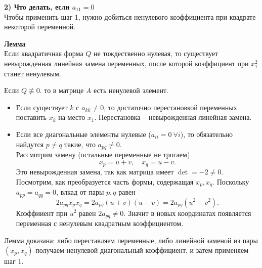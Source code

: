 \documentclass[14pt]{extreport}
\begin{document}
\begin{prbox}
        \textbf{2) Что делать, если $a_{11} = 0$}\\
        Чтобы применить шаг 1, нужно добиться ненулевого коэффициента при квадрате некоторой переменной.
        \begin{thbox}
            \textbf{Лемма}\\
            Если квадратичная форма $Q$ не тождественно нулевая, то существует невырожденная линейная замена переменных, после которой коэффициент при $x_1^2$ станет ненулевым.
        \end{thbox}
        \begin{prbox}
            Если $Q \not\equiv 0$. то в матрице $A$ есть ненулевой элемент.
            \begin{itemize}
                \item Если существует $k$ с $a_{kk} \neq 0$, то достаточно перестановкой переменных поставить $x_k$ на место $x_1$. Перестановка – невырожденная линейная замена.
                \item Если все диагональные элементы нулевые ($a_{ii} = 0\ \forall i$), то обязательно найдутся $p \neq q$ такие, что $a_{pq} \neq 0$.\\
                Рассмотрим замену (остальные переменные не трогаем)
                \[
                x_p = u + v, \quad x_q = u - v.
                \]
                Это невырожденная замена, так как матрица имеет $\det = -2 \neq 0$.\\
                Посмотрим, как преобразуется часть формы, содержащая $x_p, x_q$. Поскольку $a_{pp} = a_{qq} = 0$, влкад от пары $p,q$ равен
                \[
                2a_{pq}x_px_q = 2a_{pq}(u+v)(u-v) = 2a_{pq}(u^2-v^2).
                \]
                Коэффииент при $u^2$ равен $2a_{pq} \neq 0$. Значит в новых координатах появляется переменная с ненулевым квадратным коэффициентом.
            \end{itemize}
            Лемма доказана: либо переставляем переменные, либо линейной заменой из пары $(x_p, x_q)$ получаем ненулевой диагональный коэффициент, и затем применяем шаг 1.
        \end{prbox}


\end{prbox}
\end{document}
